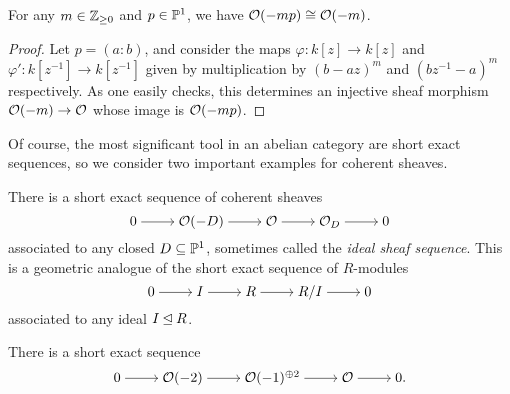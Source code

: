 \begin{lemma}
  \label{prop_ideal_sheaf_twist}
  For any $m \in \mathbb{Z}_{\geq 0}$ and $p \in \mathbb{P}^{{1}}$, we have $\mathcal{O}({-mp})
  \cong \mathcal{O}({-m})$.
\end{lemma}

\begin{proof}
  Let $p = (a : b)$, and consider the maps $\varphi: k[z] \to k[z]$
  and $\varphi': k[z^{-1}] \to k[z^{-1}]$ given by multiplication by
  $(b - az)^m$ and $(bz^{-1} - a)^m$ respectively.
  As one easily checks, this determines an injective sheaf morphism
  $\mathcal{O}({-m}) \to \mathcal{O}$ whose image is $\mathcal{O}({-mp})$.
\end{proof}

Of course, the most significant tool in an abelian category are short
exact sequences, so we consider two important examples for coherent sheaves.

\begin{example}
  There is a short exact sequence of coherent sheaves
  \[
    \begin{tikzcd}[cramped]
      0 & {\twist{-D}} & {\shf{O}} & {\skyscraper{D}} & 0
      \arrow[from=1-1, to=1-2]
      \arrow[from=1-2, to=1-3]
      \arrow[from=1-3, to=1-4]
      \arrow[from=1-4, to=1-5]
    \end{tikzcd}
  \]
  associated to any closed $D \subseteq \mathbb{P}^{{1}}$, sometimes called
  the \emph{ideal sheaf sequence}.
  This is a geometric analogue of the short exact sequence of $R$-modules
  \[
    \begin{tikzcd}[cramped]
      0 & I & R & {R/I} & 0
      \arrow[from=1-1, to=1-2]
      \arrow[from=1-2, to=1-3]
      \arrow[from=1-3, to=1-4]
      \arrow[from=1-4, to=1-5]
    \end{tikzcd}
  \]
  associated to any ideal $I \unlhd R$.
\end{example}

\begin{proposition}
  There is a short exact sequence
  \[
    \begin{tikzcd}[cramped]
      0 & {\twist{-2}} & {\twist{-1}^{\biprod 2}} & {\shf{O}} & 0.
      \arrow[from=1-1, to=1-2]
      \arrow[from=1-2, to=1-3]
      \arrow[from=1-3, to=1-4]
      \arrow[from=1-4, to=1-5]
    \end{tikzcd}
  \]
  \vspace{-24pt}
\end{proposition}

